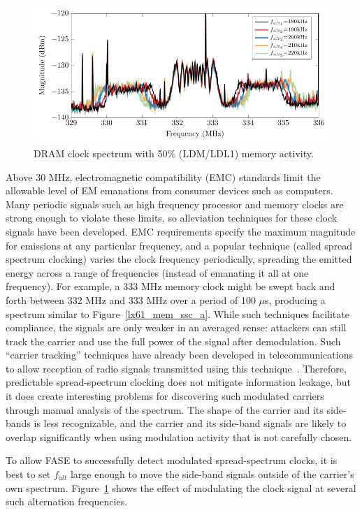 \begin{figure}[b]
\centering
\includegraphics[trim=0.1in 0.10in 0.1in 0.09in,clip,width=5in]{../fase/Data/lx61_mem_ssc_b.pdf}%
\caption{DRAM clock spectrum with 50\% (LDM/LDL1) memory activity.}%
\label{lx61_mem_ssc_b}%
\end{figure}
Above 30 MHz, electromagnetic compatibility (EMC) standards limit the allowable level of EM emanations from consumer devices such as computers. Many periodic signals such as high frequency processor and memory clocks are strong enough to violate these limits, so alleviation techniques for these clock signals have been developed. EMC requirements specify the maximum magnitude for emissions at any particular frequency, and a popular technique (called spread spectrum clocking) varies the clock frequency periodically, spreading the emitted energy across a range of frequencies (instead of emanating it all at one frequency). For example, a 333 MHz memory clock might be swept back and forth between 332 MHz and 333 MHz over a period of 100 $\mu$s, producing a spectrum similar to %
Figure~\ref{lx61_mem_ssc_a}. While such techniques facilitate compliance, the signals are only weaker in an averaged sense: attackers can still track the carrier and use the full power of the signal after demodulation. Such ``carrier tracking'' techniques have already been developed in telecommunications to allow reception of radio signals transmitted using this technique~\cite{chung_1993}. Therefore, predictable spread-spectrum clocking does not mitigate information leakage, but it does create interesting problems for discovering such modulated carriers through manual analysis of the spectrum. The shape of the carrier and its side-bands is less recognizable, and the carrier and its side-band signals are likely to overlap significantly when using modulation activity that is not carefully chosen. 

To allow FASE to successfully detect modulated spread-spectrum clocks, it is best to set $f_{alt}$ large enough to move the side-band signals outside of the carrier's own spectrum. Figure~\ref{lx61_mem_ssc_b} shows the effect of modulating the clock signal at several such alternation frequencies.
%

